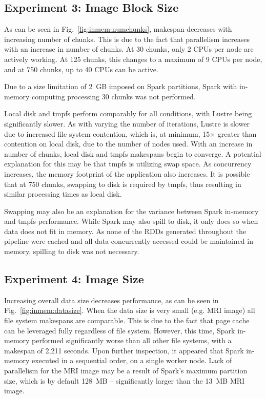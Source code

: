 \subsection{Experiment 3: Image Block Size}

As can be seen in Fig.~\ref{fig:inmem:numchunks}, makespan decreases with increasing
number of chunks. This is due to the fact that parallelism increases with an
increase in number of chunks. At 30 chunks, only 2 CPUs per node are actively
working. At 125 chunks, this changes to a maximum of 9 CPUs per node, and at 750
chunks, up to 40 CPUs can be active.

Due to a size limitation of 2~GB imposed on Spark partitions, Spark with
in-memory computing processing 30 chunks was not performed.

Local disk and tmpfs perform comparably for all conditions, with Lustre being
significantly slower. As with varying the number of iterations, Lustre is slower
due to increased file system contention, which is, at minimum, 15$\times$ greater than
contention on local disk, due to the number of nodes used. With an increase in
number of chunks, local disk and tmpfs makespans begin to converge. A potential
explanation for this may be that tmpfs is utilizing swap space. As concurrency
increases, the memory footprint of the application also increases. It is
possible that at 750 chunks, swapping to disk is required by tmpfs, thus
resulting in similar processing times as local disk.


Swapping may also be an explanation for the variance between Spark in-memory and
tmpfs performance. While Spark may also spill to disk, it only does so when data
does not fit in memory. As none of the RDDs generated throughout the pipeline
were cached and all data concurrently accessed could be maintained in-memory,
spilling to disk was not necessary.

\subsection{Experiment 4: Image Size}

Increasing overall data size decreases performance, as can be seen in
Fig.~\ref{fig:inmem:datasize}. When the data size is very small (e.g. MRI image) all
file system makespans are comparable. This is due to the fact that page cache
can be leveraged fully regardless of file system. However, this time, Spark
in-memory performed significantly worse than all other file systems, with a
makespan of 2,211 seconds. Upon further inspection, it appeared that Spark
in-memory executed in a sequential order, on a single worker node. Lack of
parallelism for the MRI image may be a result of Spark's maximum partition size,
which is by default 128~MB -- significantly larger than the 13~MB MRI image. 

